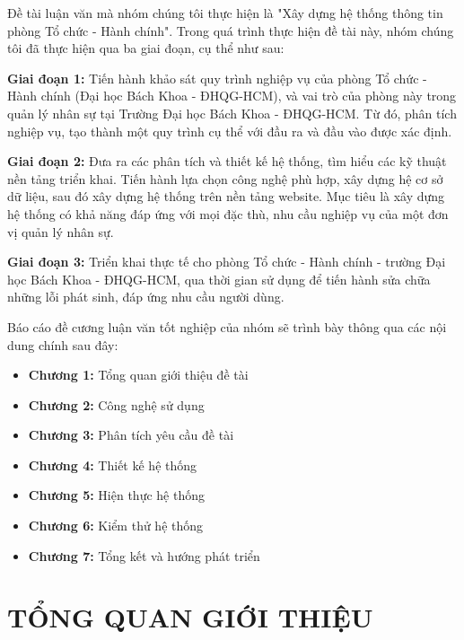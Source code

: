 \documentclass[12pt, a4paper]{report}
\begin{document}
\begin{sumary}
    Đề tài luận văn mà nhóm chúng tôi thực hiện là "Xây dựng hệ thống thông tin phòng Tổ chức - Hành chính". Trong quá trình thực hiện đề tài này, nhóm chúng tôi đã thực hiện qua ba giai đoạn, cụ thể như sau:

\textbf{Giai đoạn 1: } Tiến hành khảo sát quy trình nghiệp vụ của phòng Tổ chức - Hành chính (Đại học Bách Khoa - ĐHQG-HCM), và vai trò của phòng này trong quản lý nhân sự tại Trường Đại học Bách Khoa - ĐHQG-HCM. Từ đó, phân tích nghiệp vụ, tạo thành một quy trình cụ thể với đầu ra và đầu vào được xác định.

\textbf{Giai đoạn 2: } Đưa ra các phân tích và thiết kế hệ thống, tìm hiểu các kỹ thuật nền tảng triển khai. Tiến hành lựa chọn công nghệ phù hợp, xây dựng hệ cơ sở dữ liệu, sau đó xây dựng hệ thống trên nền tảng website. Mục tiêu là xây dựng hệ thống có khả năng đáp ứng với mọi đặc thù, nhu cầu nghiệp vụ của một đơn vị quản lý nhân sự.

\textbf{Giai đoạn 3: } Triển khai thực tế cho phòng Tổ chức - Hành chính - trường Đại học Bách Khoa - ĐHQG-HCM, qua thời gian sử dụng để tiến hành sửa chữa những lỗi phát sinh, đáp ứng nhu cầu người dùng.

    Báo cáo đề cương luận văn tốt nghiệp của nhóm sẽ trình bày thông qua các nội dung chính sau đây:
    \begin{itemize}
        \item \textbf{Chương 1:} Tổng quan giới thiệu đề tài
        \item \textbf{Chương 2:} Công nghệ sử dụng
        \item \textbf{Chương 3:} Phân tích yêu cầu đề tài
        \item \textbf{Chương 4:} Thiết kế hệ thống
        \item \textbf{Chương 5:} Hiện thực hệ thống
        \item \textbf{Chương 6:} Kiểm thử hệ thống
        \item \textbf{Chương 7:} Tổng kết và hướng phát triển
    \end{itemize}
\end{sumary}
\tableofcontents
\newpage
\listoffigures
\newpage
\listoftables
\newpage

\chapter{\textbf{TỔNG QUAN GIỚI THIỆU }}
\newpage

\newpage
\end{document}
